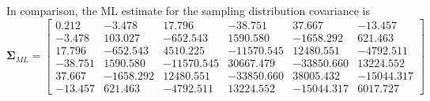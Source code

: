 \documentclass{article}
\begin{document}
In comparison, the ML estimate for the sampling distribution covariance is
\begin{equation}
\boldsymbol\Sigma_{ML} = 
\begin{bmatrix}
0.212 & -3.478 & 17.796 & -38.751 & 37.667 & -13.457 \\
-3.478 & 103.027 & -652.543 & 1590.580 & -1658.292 & 621.463 \\
17.796 & -652.543 & 4510.225 & -11570.545 & 12480.551 & -4792.511 \\
-38.751 & 1590.580 & -11570.545 & 30667.479 & -33850.660 & 13224.552 \\
37.667 & -1658.292 & 12480.551 & -33850.660 & 38005.432 & -15044.317 \\
-13.457 & 621.463 & -4792.511 & 13224.552 & -15044.317 &  6017.727 
\end{bmatrix}
\end{equation}
\end{document}
